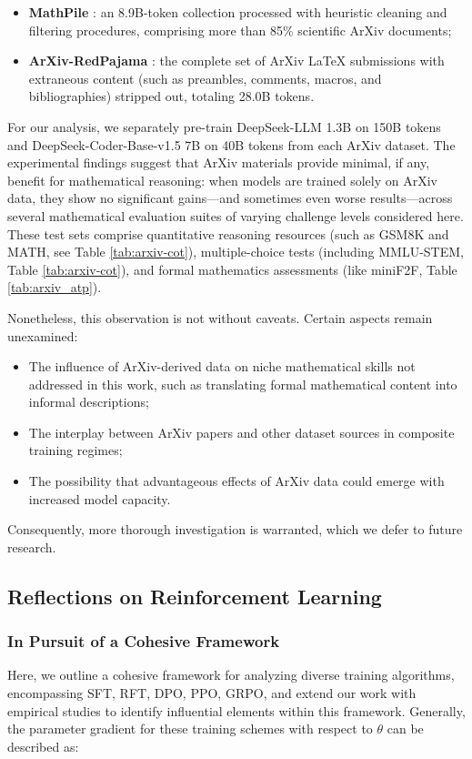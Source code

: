 \begin{itemize}[topsep=0pt]
    \item \textbf{MathPile} \citep{mathpile}: an 8.9B-token collection processed with heuristic cleaning and filtering procedures, comprising more than 85\% scientific ArXiv documents;
    \item \textbf{ArXiv-RedPajama} \citep{redpajama}: the complete set of ArXiv LaTeX submissions with extraneous content (such as preambles, comments, macros, and bibliographies) stripped out, totaling 28.0B tokens.
\end{itemize}

For our analysis, we separately pre-train DeepSeek-LLM 1.3B on 150B tokens and DeepSeek-Coder-Base-v1.5 7B on 40B tokens from each ArXiv dataset. The experimental findings suggest that ArXiv materials provide minimal, if any, benefit for mathematical reasoning: when models are trained solely on ArXiv data, they show no significant gains—and sometimes even worse results—across several mathematical evaluation suites of varying challenge levels considered here. These test sets comprise quantitative reasoning resources (such as GSM8K and MATH, see Table \ref{tab:arxiv-cot}), multiple-choice tests (including MMLU-STEM, Table \ref{tab:arxiv-cot}), and formal mathematics assessments (like miniF2F, Table \ref{tab:arxiv_atp}).

Nonetheless, this observation is not without caveats. Certain aspects remain unexamined:

\begin{itemize}[topsep=0pt]
    \item The influence of ArXiv-derived data on niche mathematical skills not addressed in this work, such as translating formal mathematical content into informal descriptions;
    \item The interplay between ArXiv papers and other dataset sources in composite training regimes;
    \item The possibility that advantageous effects of ArXiv data could emerge with increased model capacity.
\end{itemize}

Consequently, more thorough investigation is warranted, which we defer to future research.

\subsection{Reflections on Reinforcement Learning}
\subsubsection{In Pursuit of a Cohesive Framework} Here, we outline a cohesive framework for analyzing diverse training algorithms, encompassing SFT, RFT, DPO, PPO, GRPO, and extend our work with empirical studies to identify influential elements within this framework. Generally, the parameter gradient for these training schemes with respect to $\theta$ can be described as:

